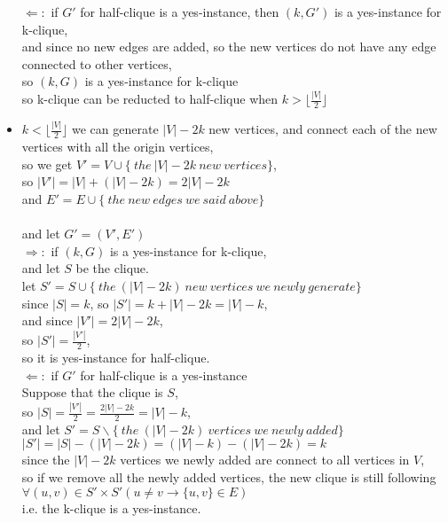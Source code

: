 \begin{parts}
\begin{solution}
\begin{itemize}
			$\Leftarrow:$ if $G'$ for half-clique is a yes-instance, then $(k,G')$ is a yes-instance for k-clique,\\
			and since no new edges are added, so the new vertices do not have any edge connected to other vertices,\\
			so $(k,G)$ is a yes-instance for k-clique\\
			so k-clique can be reducted to half-clique when $k>\lfloor\frac{|V|}{2}\rfloor$\\
			\item $k<\lfloor\frac{|V|}{2}\rfloor$
			we can generate $|V|-2k$ new vertices, and connect each of the new vertices with all the origin vertices,\\
			so we get $V'=V\cup \{\ the\ |V|-2k\ new\ vertices\}$,\\
			so $|V'|=|V| + (|V|- 2k) = 2|V|-2k$\\
			and $E'=E\cup \{\ the\ new\ edges\ we\ said\ above\}$\\
			\\and let $G'=(V',E')$\\
			$\Rightarrow:$  if $(k,G)$ is a yes-instance for k-clique,\\
			and let $S$ be the clique.\\
			let $S' = S \cup \{\ the\ (|V|-2k)\ new\ vertices\ we\ newly\ generate\}$\\
			since $|S| = k$, so $|S'| = k + |V| - 2k = |V| - k$,\\
			and since $|V'|=2|V|-2k$,\\
			so $|S'|=\frac{|V'|}{2}$,\\
			so it is yes-instance for half-clique.\\

			$\Leftarrow:$ if $G'$ for half-clique is a yes-instance\\
			Suppose that the clique is $S$,\\
			so $|S|=\frac{|V'|}{2}=\frac{2|V|-2k}{2}=|V|-k$,\\
			and let $S'=S\backslash \{\ the\ (|V|-2k)\ vertices\ we\ newly\ added\}$\\
			$|S'|=|S|-(|V|-2k)=(|V|-k)-(|V|-2k)=k$\\
			since the $|V|-2k$ vertices we newly added are connect to all vertices in $V$,\\
			so if we remove all the newly added vertices, the new clique is still following
			$\forall (u,v)\in S'\times S' (u\neq v\to \{u,v\}\in E)$\\
			i.e. the k-clique is a yes-instance.\\


\end{itemize}
\end{solution}
\end{parts}
